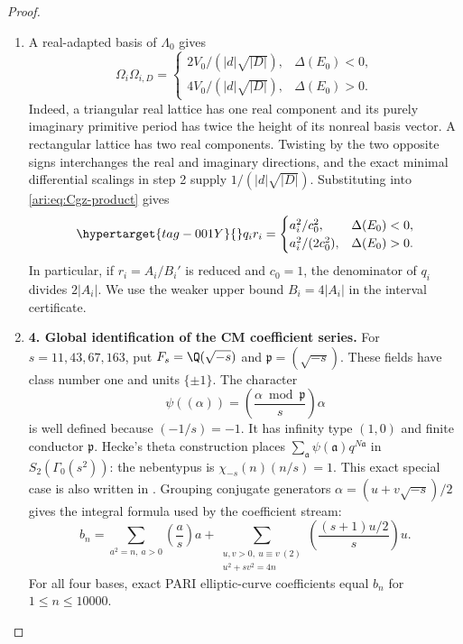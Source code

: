 \begin{proof}
\begin{enumerate}[label=\arabic*.,leftmargin=*]
\item A real-adapted basis of $\Lambda_0$ gives
\[
 \Omega_i\Omega_{i,D}=
 \begin{cases}
 2V_0/(|d|\sqrt{|D|}),&\Delta(E_0)<0,\\
 4V_0/(|d|\sqrt{|D|}),&\Delta(E_0)>0.
 \end{cases}
\]
Indeed, a triangular real lattice has one real component and its
purely imaginary primitive period has twice the height of its
nonreal basis vector. A rectangular lattice has two real
components. Twisting by the two opposite signs interchanges the
real and imaginary directions, and the exact minimal differential
scalings in step 2 supply $1/(|d|\sqrt{|D|})$.
Substituting into \eqref{ari:eq:Cgz-product} gives
\begin{equation}\hypertarget{tag-001Y}{}\label{ari:eq:Cgz-denominator}
 q_ir_i=
 \begin{cases}
 a_i^2/c_0^2,&\Delta(E_0)<0,\\
 a_i^2/(2c_0^2),&\Delta(E_0)>0.
 \end{cases}
\end{equation}
In particular, if $r_i=A_i/B_i'$ is reduced and $c_0=1$, the
denominator of $q_i$ divides $2|A_i|$. We use the weaker upper
bound $B_i=4|A_i|$ in the interval certificate.

\item \textbf{4. Global identification of the CM coefficient series.}
For $s=11,43,67,163$, put
$F_s=\Q(\sqrt{-s})$ and $\mathfrak p=(\sqrt{-s})$.
These fields have class number one and units $\{\pm1\}$.
The character
\[
 \psi((\alpha))=
  \left(\frac{\alpha\bmod\mathfrak p}{s}\right)\alpha
\]
is well defined because $(-1/s)=-1$. It has infinity type $(1,0)$
and finite conductor $\mathfrak p$. Hecke's theta construction
places $\sum_{\mathfrak a}\psi(\mathfrak a)q^{N\mathfrak a}$ in
$S_2(\Gamma_0(s^2))$: the nebentypus is
$\chi_{-s}(n)(n/s)=1$. This exact special case is also written
in \citet[\S3, pp.~4--5]{CrDarmon2009}. Grouping conjugate
generators $\alpha=(u+v\sqrt{-s})/2$ gives the integral formula
used by the coefficient stream:
\[
 b_n=\sum_{a^2=n,\ a>0}\left(\frac as\right)a
  +\sum_{\substack{u,v>0,\ u\equiv v\ (2)\\u^2+sv^2=4n}}
       \left(\frac{(s+1)u/2}{s}\right)u.
\]
For all four bases, exact PARI elliptic-curve coefficients equal
$b_n$ for $1\leq n\leq10000$.


\end{enumerate}
\end{proof}
